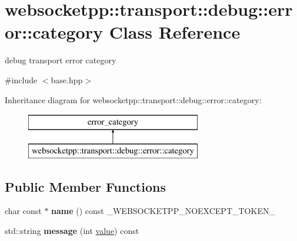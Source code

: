 \hypertarget{classwebsocketpp_1_1transport_1_1debug_1_1error_1_1category}{}\section{websocketpp\+:\+:transport\+:\+:debug\+:\+:error\+:\+:category Class Reference}
\label{classwebsocketpp_1_1transport_1_1debug_1_1error_1_1category}


debug transport error category  




{\ttfamily \#include $<$base.\+hpp$>$}

Inheritance diagram for websocketpp\+:\+:transport\+:\+:debug\+:\+:error\+:\+:category\+:\begin{figure}[H]
\begin{center}
\leavevmode
\includegraphics[height=2.000000cm]{classwebsocketpp_1_1transport_1_1debug_1_1error_1_1category}
\end{center}
\end{figure}
\subsection*{Public Member Functions}
\begin{DoxyCompactItemize}
\item 
char const  $\ast$ {\bfseries name} () const \+\_\+\+W\+E\+B\+S\+O\+C\+K\+E\+T\+P\+P\+\_\+\+N\+O\+E\+X\+C\+E\+P\+T\+\_\+\+T\+O\+K\+E\+N\+\_\+\hypertarget{classwebsocketpp_1_1transport_1_1debug_1_1error_1_1category_a19f55b05a90e1e825a4caabd86f8ce90}{}\label{classwebsocketpp_1_1transport_1_1debug_1_1error_1_1category_a19f55b05a90e1e825a4caabd86f8ce90}

\item 
std\+::string {\bfseries message} (int \hyperlink{namespacewebsocketpp_1_1transport_1_1debug_1_1error_a5ee6badaa3c5ebb600c4062394fac69c}{value}) const\hypertarget{classwebsocketpp_1_1transport_1_1debug_1_1error_1_1category_a7d0a64e6e755b3870158d30fd1721ca5}{}\label{classwebsocketpp_1_1transport_1_1debug_1_1error_1_1category_a7d0a64e6e755b3870158d30fd1721ca5}

\end{DoxyCompactItemize}


